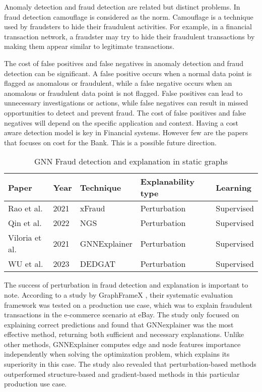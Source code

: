 Anomaly detection and fraud detection are related but distinct problems. In fraud detection camouflage is considered as the norm. Camouflage is a technique used by fraudsters to hide their fraudulent activities. For example, in a financial transaction network, a fraudster may try to hide their fraudulent transactions by making them appear similar to legitimate transactions.

The cost of false positives and false negatives in anomaly detection and fraud detection can be significant. A false positive occurs when a normal data point is flagged as anomalous or fraudulent, while a false negative occurs when an anomalous or fraudulent data point is not flagged. False positives can lead to unnecessary investigations or actions, while false negatives can result in missed opportunities to detect and prevent fraud. The cost of false positives and false negatives will depend on the specific application and context. Having a cost aware detection model is key in Financial systems. However few are the papers that focuses on cost for the Bank. This is a possible future direction.



\begin{table}
\caption{GNN Fraud detection and explanation in static graphs}\label{tab1}
\begin{tabular}{|l|l|l|l|l|}
\hline
Paper &  Year & Technique & Explanability type & Learning\\
\hline
Rao et al.\cite{rao_xfraud_2021} & 2021 & xFraud & Perturbation & Supervised\\
Qin et al.\cite{qin_explainable_2022} & 2022 & NGS & Perturbation & Supervised\\
Viloria et al.\cite{acevedo-viloria_relational_2021} & 2021 & GNNExplainer & Perturbation& Supervised\\
 WU et al.\cite{wu_dedgat_2023}& 2023 & DEDGAT & Perturbation& Supervised\\
\hline
\end{tabular}
\end{table}

The success of perturbation in fraud detection and explanation is important to note. According to a study by GraphFrameX \cite{amara_graphframex_2022}, their systematic evaluation framework was tested on a production use case, which was to explain fraudulent transactions in the e-commerce scenario at eBay. The study only focused on explaining correct predictions and found that GNNexplainer was the most effective method, returning both sufficient and necessary explanations. Unlike other methods, GNNExplainer computes edge and node features importance independently when solving the optimization problem, which explains its superiority in this case. The study also revealed that perturbation-based methods outperformed structure-based and gradient-based methods in this particular production use case. 

